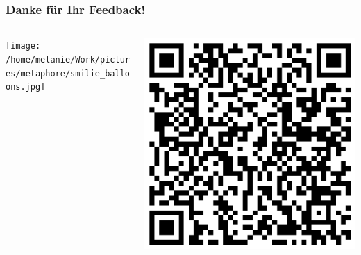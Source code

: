 \documentclass{beamer}
\begin{document}
\begin{frame}
\frametitle{Danke für Ihr Feedback!}

\begin{columns}[c]

\begin{column}{6cm}
\begin{center}
\texttt{[image: /home/melanie/Work/pictures/metaphore/smilie\_balloons.jpg]}
\end{center}

\end{column}

\begin{column}{4cm}


\begin{center}
\includegraphics[width=\textwidth]{feedback_QR.png}
\end{center}
\end{column}


\end{columns}

\end{frame}
\end{document}
